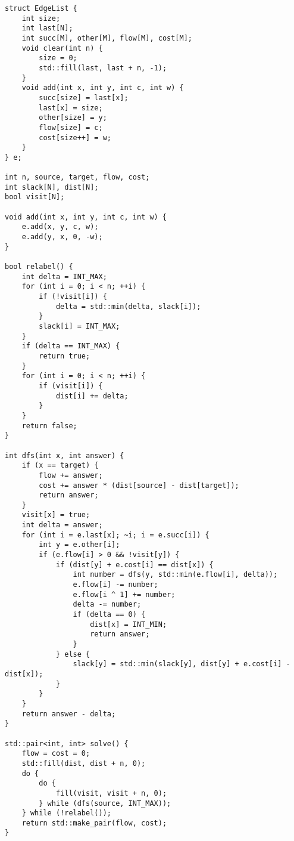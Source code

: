 \begin{lstlisting}
struct EdgeList {
    int size;
    int last[N];
    int succ[M], other[M], flow[M], cost[M];
    void clear(int n) {
        size = 0;
        std::fill(last, last + n, -1);
    }
    void add(int x, int y, int c, int w) {
        succ[size] = last[x];
        last[x] = size;
        other[size] = y;
        flow[size] = c;
        cost[size++] = w;
    }
} e;

int n, source, target, flow, cost;
int slack[N], dist[N];
bool visit[N];

void add(int x, int y, int c, int w) {
    e.add(x, y, c, w);
    e.add(y, x, 0, -w);
}

bool relabel() {
    int delta = INT_MAX;
    for (int i = 0; i < n; ++i) {
        if (!visit[i]) {
            delta = std::min(delta, slack[i]);
        }
        slack[i] = INT_MAX;
    }
    if (delta == INT_MAX) {
        return true;
    }
    for (int i = 0; i < n; ++i) {
        if (visit[i]) {
            dist[i] += delta;
        }
    }
    return false;
}

int dfs(int x, int answer) {
    if (x == target) {
        flow += answer;
        cost += answer * (dist[source] - dist[target]);
        return answer;
    }
    visit[x] = true;
    int delta = answer;
    for (int i = e.last[x]; ~i; i = e.succ[i]) {
        int y = e.other[i];
        if (e.flow[i] > 0 && !visit[y]) {
            if (dist[y] + e.cost[i] == dist[x]) {
                int number = dfs(y, std::min(e.flow[i], delta));
                e.flow[i] -= number;
                e.flow[i ^ 1] += number;
                delta -= number;
                if (delta == 0) {
                    dist[x] = INT_MIN;
                    return answer;
                }
            } else {
                slack[y] = std::min(slack[y], dist[y] + e.cost[i] - dist[x]);
            }
        }
    }
    return answer - delta;
}

std::pair<int, int> solve() {
    flow = cost = 0;
    std::fill(dist, dist + n, 0);
    do {
        do {
            fill(visit, visit + n, 0);
        } while (dfs(source, INT_MAX));
    } while (!relabel());
    return std::make_pair(flow, cost);
}
\end{lstlisting}
